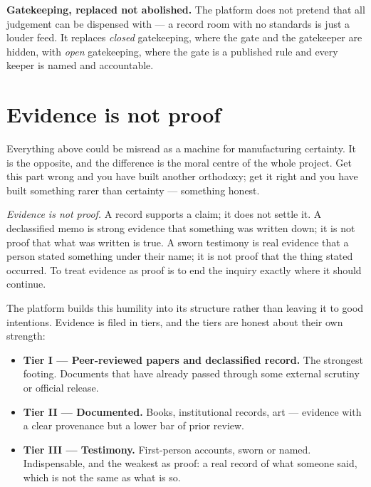 \documentclass[11pt,a4paper]{article}
\begin{document}
\begin{notebox}
\textbf{Gatekeeping, replaced not abolished.} The platform does not pretend
that all judgement can be dispensed with --- a record room with no standards
is just a louder feed. It replaces \emph{closed} gatekeeping, where the gate
and the gatekeeper are hidden, with \emph{open} gatekeeping, where the gate
is a published rule and every keeper is named and accountable.
\end{notebox}

\section{Evidence is not proof}

Everything above could be misread as a machine for manufacturing
certainty. It is the opposite, and the difference is the moral centre of
the whole project. Get this part wrong and you have built another orthodoxy;
get it right and you have built something rarer than certainty --- something
honest.

\emph{Evidence is not proof.} A record supports a claim; it does not settle
it. A declassified memo is strong evidence that something was written down;
it is not proof that what was written is true. A sworn testimony is real
evidence that a person stated something under their name; it is not proof
that the thing stated occurred. To treat evidence as proof is to end the
inquiry exactly where it should continue.

The platform builds this humility into its structure rather than leaving it
to good intentions. Evidence is filed in tiers, and the tiers are honest
about their own strength:

\begin{itemize}[leftmargin=1.4em]
  \item \textbf{Tier I --- Peer-reviewed papers and declassified record.}
  The strongest footing. Documents that have already passed through some
  external scrutiny or official release.
  \item \textbf{Tier II --- Documented.} Books, institutional records, art
  --- evidence with a clear provenance but a lower bar of prior review.
  \item \textbf{Tier III --- Testimony.} First-person accounts, sworn or
  named. Indispensable, and the weakest as proof: a real record of what
  someone said, which is not the same as what is so.
\end{itemize}
\end{document}
